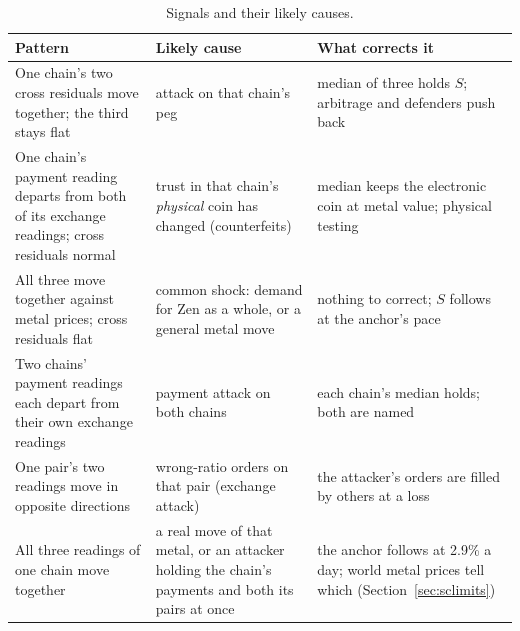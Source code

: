 \begin{table}[htbp]
\centering\small
\begin{tabularx}{\textwidth}{Y Y Y}
\toprule
\textbf{Pattern} & \textbf{Likely cause} & \textbf{What corrects it}\\
\midrule
One chain's two cross residuals move together; the third stays flat & attack on that chain's peg & median of three holds $S$; arbitrage and defenders push back\\
One chain's payment reading departs from both of its exchange readings; cross residuals normal & trust in that chain's \emph{physical} coin has changed (counterfeits) & median keeps the electronic coin at metal value; physical testing\\
All three move together against metal prices; cross residuals flat & common shock: demand for Zen as a whole, or a general metal move & nothing to correct; $S$ follows at the anchor's pace\\
Two chains' payment readings each depart from their own exchange readings & payment attack on both chains & each chain's median holds; both are named\\
One pair's two readings move in opposite directions & wrong-ratio orders on that pair (exchange attack) & the attacker's orders are filled by others at a loss\\
All three readings of one chain move together & a real move of that metal, or an attacker holding the chain's payments and both its pairs at once & the anchor follows at 2.9\% a day; world metal prices tell which (Section~\ref{sec:sclimits})\\
\bottomrule
\end{tabularx}
\caption{Signals and their likely causes.}
\label{tab:signals}
\end{table}

